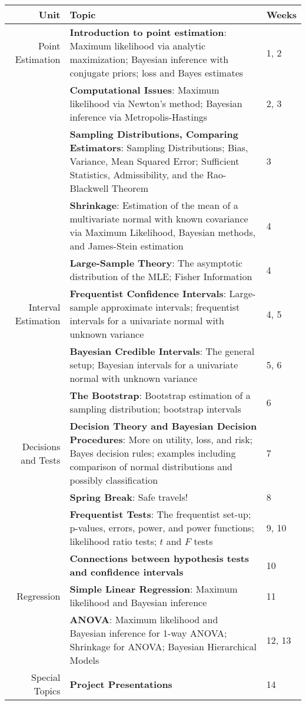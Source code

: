\documentclass[11pt]{article}
\begin{document}
\begin{table}
\begin{tabular}{r p{11cm} l}
\toprule
Unit & Topic & Weeks \\
\midrule
Point Estimation & \textbf{Introduction to point estimation}: Maximum likelihood via analytic maximization; Bayesian inference with conjugate priors; loss and Bayes estimates & 1, 2 \\
\cmidrule(r){2-3}
 & \textbf{Computational Issues}: Maximum likelihood via Newton's method; Bayesian inference via Metropolis-Hastings & 2, 3 \\
\cmidrule(r){2-3}
 & \textbf{Sampling Distributions, Comparing Estimators}: Sampling Distributions; Bias, Variance, Mean Squared Error; Sufficient Statistics, Admissibility, and the Rao-Blackwell Theorem & 3 \\
\cmidrule(r){2-3}
 & \textbf{Shrinkage}: Estimation of the mean of a multivariate normal with known covariance via Maximum Likelihood, Bayesian methods, and James-Stein estimation & 4 \\
\cmidrule(r){2-3}
 & \textbf{Large-Sample Theory}: The asymptotic distribution of the MLE; Fisher Information & 4 \\
\midrule
Interval Estimation & \textbf{Frequentist Confidence Intervals}: Large-sample approximate intervals; frequentist intervals for a univariate normal with unknown variance & 4, 5 \\
\cmidrule(r){2-3}
 & \textbf{Bayesian Credible Intervals}: The general setup; Bayesian intervals for a univariate normal with unknown variance & 5, 6 \\
\cmidrule(r){2-3}
 & \textbf{The Bootstrap}: Bootstrap estimation of a sampling distribution; bootstrap intervals & 6 \\
\midrule
Decisions and Tests & \textbf{Decision Theory and Bayesian Decision Procedures}: More on utility, loss, and risk; Bayes decision rules; examples including comparison of normal distributions and possibly classification & 7 \\
\cmidrule(r){2-3}
 & \textbf{Spring Break}: Safe travels! & 8 \\
\cmidrule(r){2-3}
 & \textbf{Frequentist Tests}: The frequentist set-up; p-values, errors, power, and power functions; likelihood ratio tests; $t$ and $F$ tests & 9, 10 \\
\cmidrule(r){2-3}
 & \textbf{Connections between hypothesis tests and confidence intervals} & 10 \\
\midrule
Regression & \textbf{Simple Linear Regression}: Maximum likelihood and Bayesian inference & 11 \\
\cmidrule(r){2-3}
 & \textbf{ANOVA}: Maximum likelihood and Bayesian inference for 1-way ANOVA; Shrinkage for ANOVA; Bayesian Hierarchical Models & 12, 13 \\
\midrule
Special Topics & \textbf{Project Presentations} & 14 \\
\bottomrule
\end{tabular}
\end{table}
\end{document}
